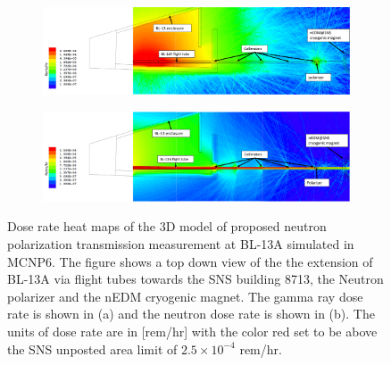 \begin{landscape}
\thispagestyle{mylandscape}
 \begin{figure}
    \centering
    \begin{subfigure}[b]{1.2\textwidth}
    \includegraphics[width=1\linewidth]{fig3.png}
    \caption{}
    \label{fig:gammadose} 
    \end{subfigure}
    \begin{subfigure}[b]{1.2\textwidth}
    \includegraphics[width=1\linewidth]{fig4.png}
    \caption{}
    \label{fig:neutrondose}
    \end{subfigure}
\caption{Dose rate heat maps of the 3D model of proposed neutron polarization transmission measurement at BL-13A simulated in MCNP6. The figure shows a top down view of the the extension of BL-13A via flight tubes towards the SNS building 8713, the Neutron polarizer and the nEDM cryogenic magnet. The gamma ray dose rate is shown in (a) and the neutron dose rate is shown in (b). The units of dose rate are in [rem/hr] with the color red set to be above the SNS unposted area limit of $2.5\times10^{-4}$ rem/hr.}
\label{fig:doseplot}
\end{figure}   
\end{landscape}

